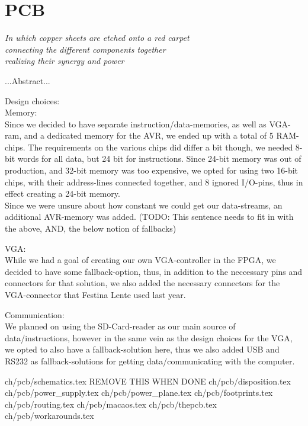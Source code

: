 \chapter {PCB}\label{ch:pcb}

\begin {flushright} {\slshape
    In which copper sheets are etched onto a red carpet\\
    connecting the different components together\\
    realizing their synergy and power
}
\end {flushright}
...Abstract...

Design choices: \\
Memory: \\
Since we decided to have separate instruction/data-memories, as well as VGA-ram, and
a dedicated memory for the AVR, we ended up with a total of 5 RAM-chips. The requirements
on the various chips did differ a bit though, we needed 8-bit words for all data, but
24 bit for instructions. Since 24-bit memory was out of production, and 32-bit memory
was too expensive, we opted for using two 16-bit chips, with their address-lines connected
together, and 8 ignored I/O-pins, thus in effect creating a 24-bit memory. \\

Since we were unsure about how constant we could get our data-streams, an additional
AVR-memory was added. (TODO: This sentence needs to fit in with the above, AND, the
below notion of fallbacks)

VGA: \\
While we had a goal of creating our own VGA-controller in the FPGA, we decided to have
some fallback-option, thus, in addition to the neccessary pins and connectors for that
solution, we also added the necessary connectors for the VGA-connector that Festina Lente
used last year.

Communication: \\
We planned on using the SD-Card-reader as our main source of data/instructions, however
in the same vein as the design choices for the VGA, we opted to also have a fallback-solution
here, thus we also added USB and RS232 as fallback-solutions for getting data/communicating
with the computer.

 {ch/pcb/schematics.tex}
REMOVE THIS WHEN DONE
 {ch/pcb/disposition.tex}
 {ch/pcb/power_supply.tex}
 {ch/pcb/power_plane.tex}
 {ch/pcb/footprints.tex}
 {ch/pcb/routing.tex}
 {ch/pcb/macaos.tex}
 {ch/pcb/thepcb.tex}
 {ch/pcb/workarounds.tex}
